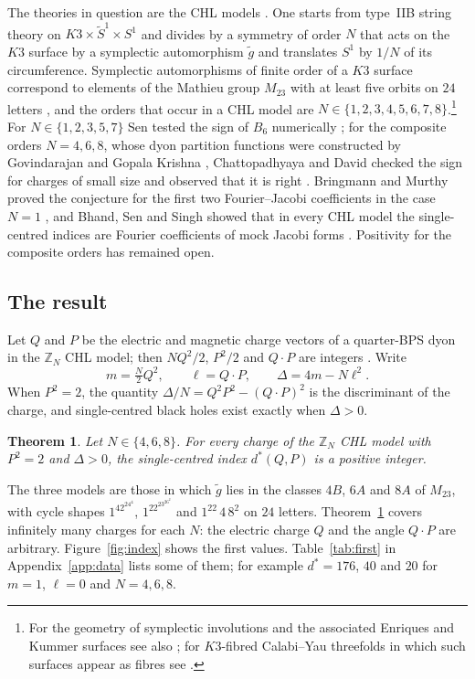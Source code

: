 \documentclass[11pt]{amsart}
\newtheorem{mainthm}{Theorem}
\theoremstyle{definition}
\newcommand{\ZZ}{\mathbb{Z}}
\begin{document}
The theories in question are the CHL models \cite{CHL95}. One starts from type~IIB string theory on $K3\times\widetilde S^1\times S^1$ and divides by a symmetry of order $N$ that acts on the $K3$ surface by a symplectic automorphism $\tilde g$ and translates $S^1$ by $1/N$ of its circumference. Symplectic automorphisms of finite order of a $K3$ surface correspond to elements of the Mathieu group $M_{23}$ with at least five orbits on $24$ letters \cite{Muk88}, and the orders that occur in a CHL model are $N\in\{1,2,3,4,5,6,7,8\}$.\footnote{For the geometry of symplectic involutions and the associated Enriques and Kummer surfaces see also \cite{BN26}; for $K3$-fibred Calabi--Yau threefolds in which such surfaces appear as fibres see \cite{Bha22}.} For $N\in\{1,2,3,5,7\}$ Sen tested the sign of $B_6$ numerically \cite{Sen11}; for the composite orders $N=4,6,8$, whose dyon partition functions were constructed by Govindarajan and Gopala Krishna \cite{GK10}, Chattopadhyaya and David checked the sign for charges of small size and observed that it is right \cite[\S3.1]{CD17}. Bringmann and Murthy proved the conjecture for the first two Fourier--Jacobi coefficients in the case $N=1$ \cite{BM13}, and Bhand, Sen and Singh showed that in every CHL model the single-centred indices are Fourier coefficients of mock Jacobi forms \cite{BSS25}. Positivity for the composite orders has remained open.

\subsection*{The result}
Let $Q$ and $P$ be the electric and magnetic charge vectors of a quarter-BPS dyon in the $\ZZ_N$ CHL model; then $NQ^2/2$, $P^2/2$ and $Q\cdot P$ are integers \cite[(5.12)]{BSS25}. Write
\[
m=\tfrac N2Q^2,\qquad \ell=Q\cdot P,\qquad \Delta=4m-N\ell^2 .
\]
When $P^2=2$, the quantity $\Delta/N=Q^2P^2-(Q\cdot P)^2$ is the discriminant of the charge, and single-centred black holes exist exactly when $\Delta>0$.

\begin{mainthm}\label{thm:A}
Let $N\in\{4,6,8\}$. For every charge of the $\ZZ_N$ CHL model with $P^2=2$ and $\Delta>0$, the single-centred index $d^*(Q,P)$ is a positive integer.
\end{mainthm}

The three models are those in which $\tilde g$ lies in the classes $4B$, $6A$ and $8A$ of $M_{23}$, with cycle shapes $1^42^24^4$, $1^22^23^26^2$ and $1^22\,4\,8^2$ on $24$ letters. Theorem~\ref{thm:A} covers infinitely many charges for each $N$: the electric charge $Q$ and the angle $Q\cdot P$ are arbitrary. Figure~\ref{fig:index} shows the first values. Table~\ref{tab:first} in Appendix~\ref{app:data} lists some of them; for example $d^*=176$, $40$ and $20$ for $m=1$, $\ell=0$ and $N=4,6,8$.
\end{document}

